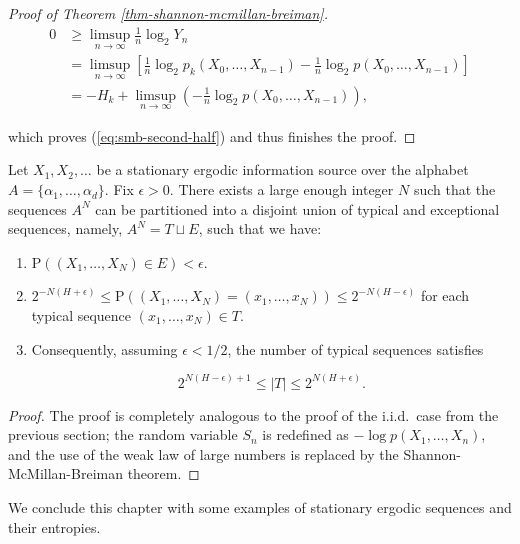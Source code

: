 \begin{proof}[Proof of Theorem \ref{thm-shannon-mcmillan-breiman}]
\begin{align*}
0 &\ge \limsup_{n\to\infty} \frac{1}{n} \log_2 Y_n \\
&= \limsup_{n\to\infty} \left[
\frac{1}{n} \log_2 p_k(X_0,\ldots,X_{n-1}) - \frac{1}{n}\log_2 p(X_0,\ldots,X_{n-1}) \right] \\
&=
-H_k + \limsup_{n\to\infty} \left(- \frac{1}{n}\log_2 p(X_0,\ldots,X_{n-1}) \right),
\end{align*}

\noindent which proves (\ref{eq:smb-second-half}) and thus finishes
the proof.
\end{proof}

\begin{thm}
Let $X_1,X_2,\ldots$ be a stationary ergodic
information source over the alphabet
$A=\{\alpha_1,\ldots,\alpha_d\}$. Fix $\epsilon>0$.
There exists a large enough integer $N$ such that the
sequences $A^N$ can be partitioned into a disjoint
union of typical and exceptional sequences, namely,
$A^N = T \sqcup E$, such that we have:

\begin{enumerate}[label=\arabic*.]
\item $\mathrm{P}((X_1,\ldots,X_N) \in E) < \epsilon$.

\item $2^{-N\left(H + \epsilon\right)} \le
\mathrm{P}((X_1,\ldots,X_N)=(x_1,\ldots,x_N)) \le
2^{-N\left(H - \epsilon\right)}$
for each typical sequence $(x_1,\ldots,x_N)\in T$.

\item Consequently, assuming $\epsilon<1/2$, the number of
typical sequences satisfies

\[
2^{N (H-\epsilon)+1} \le |T| \le 2^{N (H+\epsilon)}.
\]
\end{enumerate}

\end{thm}

\begin{proof}
The proof is completely analogous to the proof of the
i.i.d.\ case from the previous section; the random
variable $S_n$ is redefined as
$-\log p(X_1,\ldots,X_n)$, and the use of the weak
law of large numbers is replaced by the
Shannon-McMillan-Breiman theorem.
\end{proof}

\noindent We conclude this chapter with some examples of
stationary ergodic sequences and their entropies.

